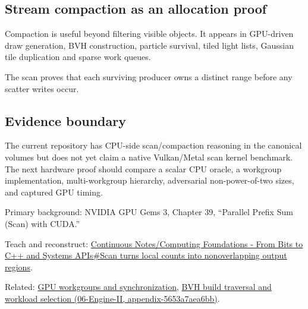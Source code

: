 \subsection{Stream compaction as an allocation proof}\label{appendix-f2ee4d086415-stream-compaction-as-an-allocation-proof}

Compaction is useful beyond filtering visible objects. It appears in GPU-driven draw generation, BVH construction, particle survival, tiled light lists, Gaussian tile duplication and sparse work queues.

The scan proves that each surviving producer owns a distinct range before any scatter writes occur.

\subsection{Evidence boundary}\label{appendix-f2ee4d086415-evidence-boundary}

The current repository has CPU-side scan/compaction reasoning in the canonical volumes but does not yet claim a native Vulkan/Metal scan kernel benchmark. The next hardware proof should compare a scalar CPU oracle, a workgroup implementation, multi-workgroup hierarchy, adversarial non-power-of-two sizes, and captured GPU timing.

Primary background: NVIDIA GPU Gems 3, Chapter 39, ``Parallel Prefix Sum (Scan) with CUDA.''

Teach and reconstruct: \hyperref[01-foundations-i-ch008-scan-turns-local-counts-into-nonoverlapping-output-regions]{Continuous Notes/Computing Foundations - From Bits to C++ and Systems APIs\#Scan turns local counts into nonoverlapping output regions}.

Related: \hyperref[appendix-f662b5b1773b]{GPU workgroups and synchronization}, \href{../06-Engine-II/main.pdf\#nameddest=appendix-5653a7aea6bb}{BVH build traversal and workload selection (06-Engine-II, appendix-5653a7aea6bb)}.
